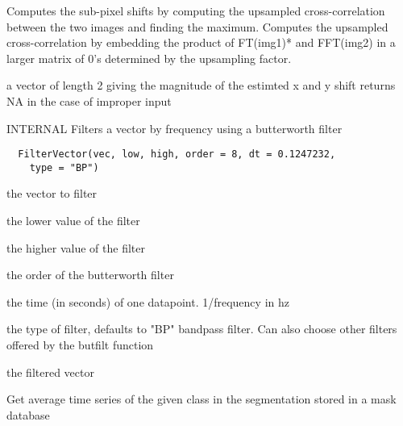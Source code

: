 \documentclass[a4paper]{book}
\begin{document}
%
\begin{Details}\relax
Computes the sub-pixel shifts by computing the upsampled
cross-correlation between the two images and finding the
maximum. Computes the upsampled cross-correlation by
embedding the product of FT(img1)* and FFT(img2) in a
larger matrix of 0's determined by the upsampling factor.
\end{Details}
%
\begin{Value}
a vector of length 2 giving the magnitude of the estimted
x and y shift returns NA in the case of improper input
\end{Value}
%
\begin{Description}\relax
INTERNAL Filters a vector by frequency using a
butterworth filter
\end{Description}
%
\begin{Usage}
\begin{verbatim}
  FilterVector(vec, low, high, order = 8, dt = 0.1247232,
    type = "BP")
\end{verbatim}
\end{Usage}
%
\begin{Arguments}
\begin{ldescription}
\item[\code{vec}] the vector to filter

\item[\code{low}] the lower value of the filter

\item[\code{high}] the higher value of the filter

\item[\code{order}] the order of the butterworth filter

\item[\code{dt}] the time (in seconds) of one datapoint.
1/frequency in hz

\item[\code{type}] the type of filter, defaults to "BP" bandpass
filter. Can also choose other filters offered by the
butfilt function
\end{ldescription}
\end{Arguments}
%
\begin{Value}
the filtered vector
\end{Value}
%
\begin{Description}\relax
Get average time series of the given class in the
segmentation stored in a mask database
\end{Description}
\end{document}
